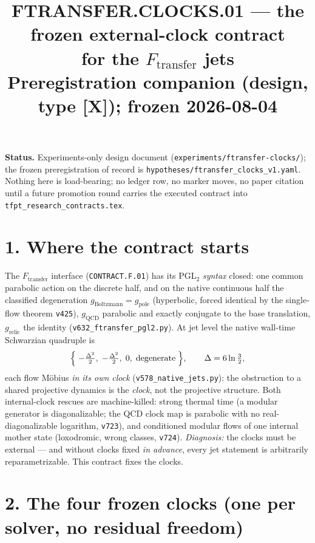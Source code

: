 \documentclass[10pt,a4paper]{article}
\title{\vspace{-1.4cm}\textbf{FTRANSFER.CLOCKS.01 --- the frozen external-clock contract\\for the $F_{\mathrm{transfer}}$ jets}\\[1mm]
\large Preregistration companion (design, type [X]); frozen 2026-08-04}
\author{}
\date{}
\begin{document}
\maketitle
\vspace{-1.4cm}

\textbf{Status.} Experiments-only design document (\texttt{experiments/ftransfer-clocks/}); the frozen
preregistration of record is \texttt{hypotheses/ftransfer\_clocks\_v1.yaml}. Nothing here is load-bearing;
no ledger row, no marker moves, no paper citation until a future promotion round carries the executed
contract into \texttt{tfpt\_research\_contracts.tex}.

\section*{1. Where the contract starts}

The $F_{\mathrm{transfer}}$ interface (\texttt{CONTRACT.F.01}) has its PGL$_2$ \emph{syntax} closed:
one common parabolic action on the discrete half, and on the native continuous half the classified
degeneration $g_{\mathrm{Boltzmann}}=g_{\mathrm{pole}}$ (hyperbolic, forced identical by the single-flow
theorem \texttt{v425}), $g_{\mathrm{QCD}}$ parabolic and exactly conjugate to the base translation,
$g_{\mathrm{relic}}$ the identity (\texttt{v632\_ftransfer\_pgl2.py}). At jet level the native wall-time
Schwarzian quadruple is
\begin{equation}
\Bigl\{\; -\tfrac{\Delta^2}{2},\; -\tfrac{\Delta^2}{2},\; 0,\; \text{degenerate} \;\Bigr\},
\qquad \Delta = 6\ln\tfrac32 ,
\label{eq:quadruple}
\end{equation}
each flow M\"obius \emph{in its own clock} (\texttt{v578\_native\_jets.py}): the obstruction to a shared
projective dynamics is the \emph{clock}, not the projective structure. Both internal-clock rescues are
machine-killed: strong thermal time (a modular generator is diagonalizable; the QCD clock map is parabolic
with no real-diagonalizable logarithm, \texttt{v723}), and conditioned modular flows of one internal mother
state (loxodromic, wrong classes, \texttt{v724}). \emph{Diagnosis:} the clocks must be external --- and
without clocks fixed \emph{in advance}, every jet statement is arbitrarily reparametrizable. This contract
fixes the clocks.

\section*{2. The four frozen clocks (one per solver, no residual freedom)}
\end{document}

